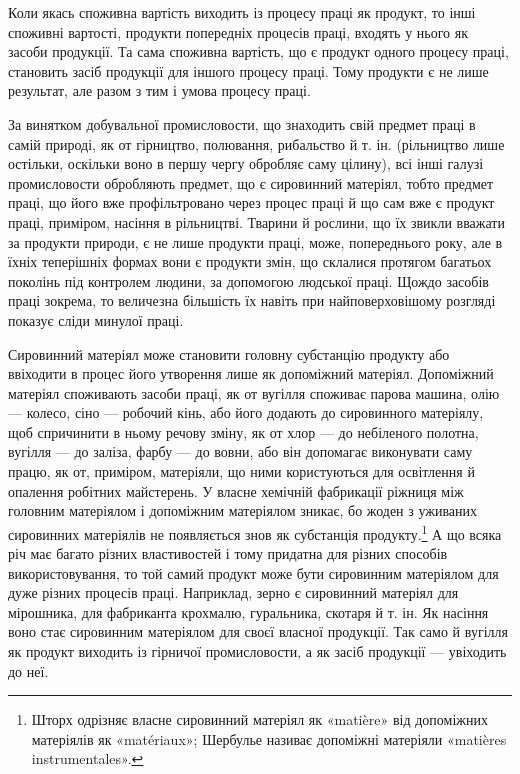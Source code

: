 Коли якась споживна вартість виходить із процесу праці як
продукт, то інші споживні вартості, продукти попередніх процесів
праці, входять у нього як засоби продукції. Та сама споживна
вартість, що є продукт одного процесу праці, становить засіб
продукції для іншого процесу праці. Тому продукти є не лише
результат, але разом з тим і умова процесу праці.

За винятком добувальної промисловости, що знаходить свій
предмет праці в самій природі, як от гірництво, полювання,
рибальство й т. ін. (рільництво лише остільки, оскільки воно в
першу чергу обробляє саму цілину), всі інші галузі промисловости
обробляють предмет, що є сировинний матеріял, тобто предмет
праці, що його вже профільтровано через процес праці й що
сам вже є продукт праці, приміром, насіння в рільництві. Тварини
й рослини, що їх звикли вважати за продукти природи, є не
лише продукти праці, може, попереднього року, але в їхніх теперішніх
формах вони є продукти змін, що склалися протягом
багатьох поколінь під контролем людини, за допомогою людської
праці. Щождо засобів праці зокрема, то величезна більшість їх
навіть при найповерховішому розгляді показує сліди минулої
праці.

Сировинний матеріял може становити головну субстанцію
продукту або ввіходити в процес його утворення лише як допоміжний
матеріял. Допоміжний матеріял споживають засоби праці,
як от вугілля споживає парова машина, олію — колесо, сіно —
робочий кінь, або його додають до сировинного матеріялу, щоб
спричинити в ньому речову зміну, як от хлор — до небіленого
полотна, вугілля — до заліза, фарбу — до вовни, або він допомагає
виконувати саму працю, як от, приміром, матеріяли, що
ними користуються для освітлення й опалення робітних майстерень.
У власне хемічній фабрикації ріжниця між головним матеріялом
і допоміжним матеріялом зникає, бо жоден з уживаних
сировинних матеріялів не появляється знов як субстанція продукту.\footnote{
Шторх одрізняє власне сировинний матеріял як «matière» від
допоміжних матеріялів як «matériaux»; Шербулье називає допоміжні
матеріяли «matières instrumentales».
}
А що всяка річ має багато різних властивостей і тому придатна
для різних способів використовування, то той самий продукт
може бути сировинним матеріялом для дуже різних процесів
праці. Наприклад, зерно є сировинний матеріял для мірошника,
для фабриканта крохмалю, гуральника, скотаря й т. ін. Як
насіння воно стає сировинним матеріялом для своєї власної продукції.
Так само й вугілля як продукт виходить із гірничої промисловости,
а як засіб продукції — увіходить до неї.


